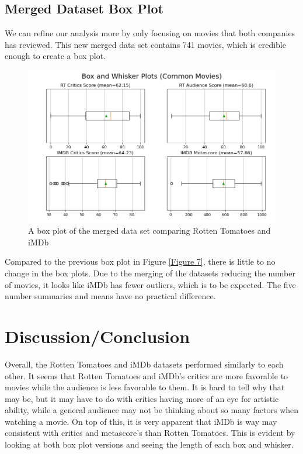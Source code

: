 \documentclass[12pt]{article}
\begin{document}
\newpage

\subsection{Merged Dataset Box Plot}
We can refine our analysis more by only focusing on movies that both companies has reviewed. This new merged data set contains 741 movies, which is credible enough to create a box plot.

\begin{figure}[h]
\begin{center}
      \includegraphics[width=6.5in]{figure13.png}
      \caption{A box plot of the merged data set comparing Rotten Tomatoes and iMDb}
      \label{Figure 13}
\end{center}
\end{figure}

\noindent Compared to the previous box plot in Figure \ref{Figure 7}, there is little to no change in the box plots. Due to the merging of the datasets reducing the number of movies, it looks like iMDb has fewer outliers, which is to be expected. The five number summaries and means have no practical difference.

\newpage

\section{Discussion/Conclusion}
Overall, the Rotten Tomatoes and iMDb datasets performed similarly to each other. It seems that Rotten Tomatoes and iMDb's critics are more favorable to movies while the audience is less favorable to them. It is hard to tell why that may be, but it may have to do with critics having more of an eye for artistic ability, while a general audience may not be thinking about so many factors when watching a movie. On top of this, it is very apparent that iMDb is way may consistent with critics and metascore's than Rotten Tomatoes. This is evident by looking at both box plot versions and seeing the length of each box and whisker. \\
\end{document}
